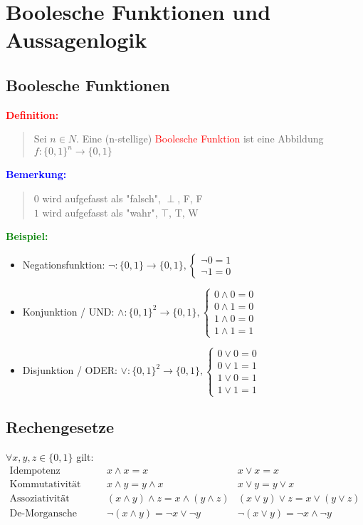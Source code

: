 \documentclass{article}
\newcommand{\red}[1]{\textcolor{red}{#1}}
\newcommand{\blue}[1]{\textcolor{blue}{#1}}
\newcommand{\green}[1]{\textcolor{green}{#1}}
\newcommand{\ex}{\green{\textbf{Beispiel: }}}
\newcommand{\de}[1]{\red{\textbf{Definition: }}\begin{quote}#1\end{quote}}
\newcommand{\an}[1]{\blue{\textbf{Bemerkung: }}\begin{quote}#1\end{quote}}
\begin{document}
\newpage
\section{Boolesche Funktionen und Aussagenlogik}

\subsection{Boolesche Funktionen}
\de{Sei $n \in N$. Eine (n-stellige) \red{Boolesche Funktion} ist eine Abbildung $f: \{0, 1\}^n \to \{0, 1\}$}
\an{
    $0$ wird aufgefasst als "falsch", $\perp$, F, F\\
    $1$ wird aufgefasst als "wahr", $\top$, T, W
}

\ex
\begin{itemize}
    \item Negationsfunktion: $\neg: \{0, 1\} \to \{0, 1\}, \begin{cases}
        \neg 0 = 1\\
        \neg 1 = 0
    \end{cases}$
    \item Konjunktion / UND: $\land: \{0, 1\}^2 \to \{0, 1\}, \begin{cases}
        0 \land 0 = 0\\
        0 \land 1 = 0\\
        1 \land 0 = 0\\
        1 \land 1 = 1
    \end{cases}$
    \item Disjunktion / ODER: $\lor: \{0, 1\}^2 \to \{0, 1\}, \begin{cases}
        0 \lor 0 = 0\\
        0 \lor 1 = 1\\
        1 \lor 0 = 1\\
        1 \lor 1 = 1
    \end{cases}$
\end{itemize}

\subsection{Rechengesetze}

$\forall x,y,z \in \{0, 1\}$ gilt:
\begin{equation*}
    \begin{array}{lcl}
        \text{Idempotenz} & x \land x = x & x \lor x = x\\
        \text{Kommutativität} & x \land y = y \land x & x \lor y = y \lor x\\
        \text{Assoziativität} & (x \land y) \land z = x \land (y \land z) & (x \lor y) \lor z = x \lor (y \lor z)\\
        \text{De-Morgansche Gesetze} & \neg(x \land y) = \neg x \lor \neg y & \neg(x \lor y) = \neg x \land \neg y
    \end{array}
\end{equation*}
\end{document}
